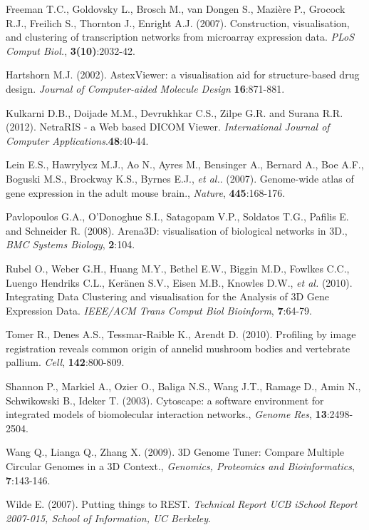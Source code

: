 \documentclass{bioinfo}
\begin{document}
\begin{thebibliography}{}

 Freeman T.C., Goldovsky L., Brosch M., van Dongen S., Mazière P., Grocock R.J., Freilich S., Thornton J., Enright A.J. (2007). Construction, visualisation, and clustering of transcription networks from microarray expression data. {\it{PLoS Comput Biol.}}, {\bf{3(10)}}:2032-42.

 Hartshorn M.J. (2002). AstexViewer: a visualisation aid for structure-based drug design. {\it{Journal of Computer-aided Molecule Design}} {\bf{16}}:871-881.

 Kulkarni D.B., Doijade M.M., Devrukhkar C.S., Zilpe G.R. and Surana R.R. (2012). NetraRIS - a Web based DICOM Viewer. {\it{International Journal of Computer Applications}}.{\bf{48}}:40-44.

 Lein E.S., Hawrylycz M.J., Ao N., Ayres M., Bensinger A., Bernard A., Boe A.F., Boguski M.S., Brockway K.S., Byrnes E.J., {\it{et al.}}. (2007). Genome-wide atlas of gene expression in the adult mouse brain., {\it Nature}, {\bf{445}}:168-176.

 Pavlopoulos G.A., O'Donoghue S.I., Satagopam V.P., Soldatos T.G., Pafilis E. and Schneider R. (2008). Arena3D: visualisation of biological networks in 3D., {\it BMC Systems Biology}, {\bf{2}}:104.

 Rubel O., Weber G.H., Huang M.Y., Bethel E.W., Biggin M.D., Fowlkes C.C., Luengo Hendriks C.L., Ker\"{a}nen S.V., Eisen M.B., Knowles D.W., {\it{et al.}} (2010). Integrating Data Clustering and visualisation for the Analysis of 3D Gene Expression Data. {\it IEEE/ACM Trans Comput Biol Bioinform}, {\bf{7}}:64-79.

 Tomer R., Denes A.S., Tessmar-Raible K., Arendt D. (2010). Profiling by image registration reveals common origin of annelid mushroom bodies and vertebrate pallium. {\it{Cell}}, {\bf{142}}:800-809. 

 Shannon P., Markiel A., Ozier O., Baliga N.S., Wang J.T., Ramage D., Amin N., Schwikowski B., Ideker T. (2003). Cytoscape: a software environment for integrated models of biomolecular interaction networks., {\it Genome Res}, {\bf{13}}:2498-2504.

 Wang Q., Lianga Q., Zhang X. (2009). 3D Genome Tuner: Compare Multiple Circular Genomes in a 3D Context., {\it Genomics, Proteomics and Bioinformatics}, {\bf{7}}:143-146.

 Wilde E. (2007). Putting things to REST. {\it Technical Report UCB iSchool Report 2007-015, School of Information, UC Berkeley}.

\end{thebibliography}
\end{document}
